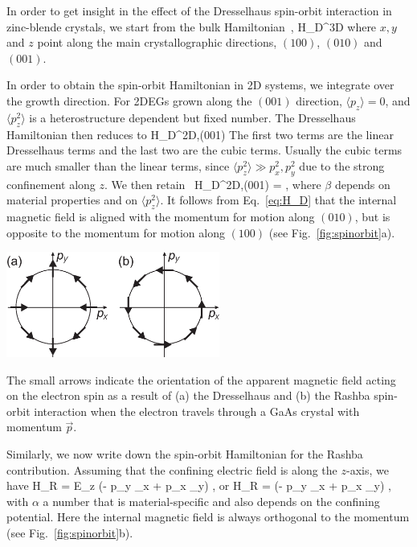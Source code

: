 \documentclass[rmp,twocolumn,aps]{revtex4}
\begin{document}
In order to get insight in the effect of the Dresselhaus
spin-orbit interaction in zinc-blende crystals, we start from the
bulk Hamiltonian~\cite{dyakonov71,wrinkler03}, 
\be 
{\cal H}_D^{3D}  
\ee 
where $x, y$ and $z$ point along
the main crystallographic directions, $(100)$, $(010)$ and
$(001)$.

In order to obtain the spin-orbit Hamiltonian in 2D systems, we
integrate over the growth direction. For 2DEGs grown along the
$(001)$ direction, $\langle p_z \rangle = 0$, and $\langle p_z^2
\rangle$ is a heterostructure dependent but fixed number. The
Dresselhaus Hamiltonian then reduces to 
\be 
{\cal H}_D^{2D,(001)}
\ee 
The first two terms are the linear Dresselhaus terms and the
last two are the cubic terms. Usually the cubic terms are much
smaller than the linear terms, since $\langle p_z^2 \rangle \gg
p_x^2, p_y^2$ due to the strong confinement along $z$. We then
retain~\cite{dresselhaus55} 
\be 
{\cal H}_D^{2D,(001)} =  \;, \label{eq:H_D} 
\ee 
where $\beta$
depends on material properties and on $\langle p_z^2 \rangle$. It
follows from Eq.~\ref{eq:H_D} that the internal magnetic field is
aligned with the momentum for motion along $(010)$, but is
opposite to the momentum for motion along $(100)$ (see
Fig.~\ref{fig:spinorbit}a).

\bfig
\begin{center}
\includegraphics[width=7cm]{hanson_fig19.eps}
\end{center}
\caption{The small arrows indicate the orientation of the apparent
magnetic field acting on the electron spin as a result of (a) the
Dresselhaus and (b) the Rashba spin-orbit interaction when the
electron travels through a GaAs crystal with momentum $\vec{p}$.}
\label{fig:spinorbit} \efig

Similarly, we now write down the spin-orbit Hamiltonian for the
Rashba contribution. Assuming that the confining electric field is
along the $z$-axis, we have 
\be 
{\cal H}_R \; \vec{\sigma} = E_z (- p_y  \sigma_x + p_x \sigma_y) \;, 
\ee
or 
\be 
{\cal H}_R = \alpha (- p_y \sigma_x + p_x \sigma_y) \;, 
\label{eq:H_R} 
\ee 
with $\alpha$ a number that is
material-specific and also depends on the confining potential.
Here the internal magnetic field is always orthogonal to the
momentum (see Fig.~\ref{fig:spinorbit}b).
\end{document}
